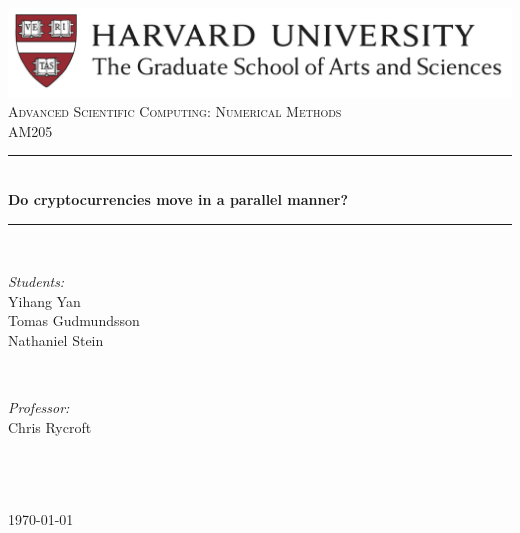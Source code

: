 \documentclass[12pt,twoside]{article}
\begin{document}
\thispagestyle{empty}
\newcommand{\HRule}{\rule{\linewidth}{0.5mm}} %

\begin{center} %
\vspace{5mm}
\includegraphics[scale=0.5]{Harvard}\\[3cm]
\textsc{\Large Advanced Scientific Computing: Numerical Methods}\\[0.5cm] %
\textsc{\large AM205}\\[2cm] %

\HRule \\[0.4cm]
{ \huge \bfseries Do cryptocurrencies move in a parallel manner?}\\[0.4cm] %
\HRule \\[2.5cm]



\begin{minipage}{0.4\textwidth}
\begin{flushleft} \large
\emph{Students:}\\
Yihang Yan\\
Tomas Gudmundsson\\
Nathaniel Stein\\
\end{flushleft}
\end{minipage}
~
\begin{minipage}{0.4\textwidth}
\begin{flushright} \large
\emph{Professor:} \\
Chris Rycroft \\%
\hspace{1mm}\\
 \hspace{1mm} \\
\end{flushright}
\end{minipage}\\[2cm]

{\large \today}\\[2cm]
\end{center}
\end{document}
